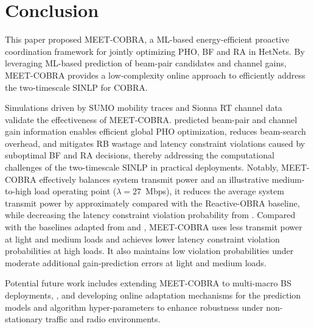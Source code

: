 \documentclass[10pt,journal,letterpaper]{journal_template/IEEEtran}
\newcommand{\rev}[1]{\textcolor{revisioncolor}{{}#1}}
\newif\ifshowdeletions
\newcommand{\currentdel}[1]{\ifshowdeletions\textcolor{deletioncolor}{\sout{#1}}\fi}
\theoremstyle{remark}
\begin{document}
\section{Conclusion}

This paper proposed MEET-COBRA, a ML-based energy-efficient proactive coordination framework for jointly optimizing PHO, BF and RA in HetNets.
By leveraging ML-based prediction of beam-pair candidates and channel gains, MEET-COBRA provides a low-complexity online approach to efficiently address the two-timescale SINLP for COBRA.

Simulations driven by SUMO mobility traces and Sionna RT channel data validate the effectiveness of MEET-COBRA.
\currentdel{The ML-driven proactive optimization mechanism delivers substantial gains: the} predicted beam-pair and channel gain information enables efficient global PHO optimization, reduces beam-search overhead, and mitigates RB wastage and latency constraint violations caused by suboptimal BF and RA decisions, thereby addressing the computational challenges of the two-timescale SINLP in practical deployments. 
Notably, MEET-COBRA effectively balances system transmit power and \currentdel{latency reliability}\currentdel{: at} an illustrative medium-to-high load operating point ($\lambda=27$~Mbps), it reduces the average system transmit power by approximately \currentdel{32\%} compared with the Reactive-OBRA baseline, while decreasing the latency constraint violation probability from \currentdel{29.47\% to 0.68\%}.
\rev{Compared with the baselines adapted from \cite{wang2024joint} and \cite{heydarian2025multitimescale}, MEET-COBRA uses less transmit power at light and medium loads and achieves lower latency constraint violation probabilities at high loads.}
\rev{It also maintains low violation probabilities under moderate additional gain-prediction errors at light and medium loads.}

Potential future work includes extending MEET-COBRA to multi-macro BS deployments, \currentdel{incorporating more realistic HO latency and signaling overhead}, and developing online adaptation mechanisms for the prediction models and algorithm hyper-parameters to enhance robustness under non-stationary traffic and radio environments.




\end{document}
